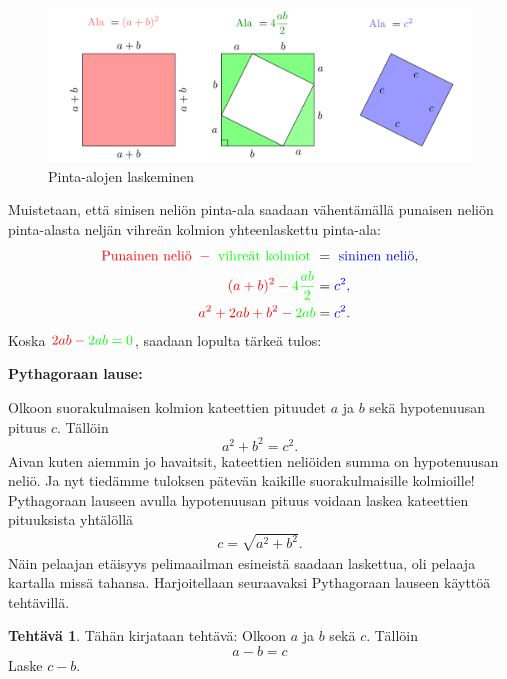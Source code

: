 \documentclass[
]{book}
\theoremstyle{definition}
\theoremstyle{definition}
\theoremstyle{definition}
\newtheorem{exercise}{Tehtävä}[chapter]
\theoremstyle{definition}
\theoremstyle{remark}
\begin{document}
\begin{figure}

{\centering \includegraphics[width=1\linewidth,height=0.4\textheight]{img/pythagoraan-teoreema-todistus} 

}

\caption{Pinta-alojen laskeminen}\label{fig:pythagoras-theorem}
\end{figure}

Muistetaan, että sinisen neliön pinta-ala saadaan vähentämällä punaisen neliön pinta-alasta neljän vihreän kolmion yhteenlaskettu pinta-ala:
\begin{align*}
 \color{red}{\text{Punainen neliö }}- \color{green}{\text{ vihreät kolmiot }}&=\color{blue}{\text{ sininen neliö}},\\
  \color{red}{(a+b)^2} - \color{green}{4\frac{ab}{2}}&=\color{blue}{c^2},\\
  \color{red}{a^2+2ab+b^2} - \color{green}{2ab}&=\color{blue}{c^2}.
\end{align*}
Koska \(\color{red}{2ab} - \color{green}{2ab}=0\), saadaan lopulta tärkeä tulos:

\textbf{Pythagoraan lause:}

Olkoon suorakulmaisen kolmion kateettien pituudet \(a\) ja \(b\) sekä hypotenuusan pituus \(c\). Tällöin
\begin{equation*}
  a^2+b^2=c^2.
\end{equation*}
Aivan kuten aiemmin jo havaitsit, kateettien neliöiden summa on hypotenuusan neliö. Ja nyt tiedämme tuloksen pätevän kaikille suorakulmaisille kolmioille! Pythagoraan lauseen avulla hypotenuusan pituus voidaan laskea kateettien pituuksista yhtälöllä
\begin{align*}
  c=\sqrt{a^2+b^2}.
\end{align*}
Näin pelaajan etäisyys pelimaailman esineistä saadaan laskettua, oli pelaaja kartalla missä tahansa. Harjoitellaan seuraavaksi Pythagoraan lauseen käyttöä tehtävillä.

\begin{exercise}
\protect\hypertarget{exr:unnamed-chunk-9}{}\label{exr:unnamed-chunk-9}Tähän kirjataan tehtävä: Olkoon \(a\) ja \(b\) sekä \(c\). Tällöin
\begin{equation*}
  a-b=c
\end{equation*}
Laske \(c-b\).
\end{exercise}
\end{document}
